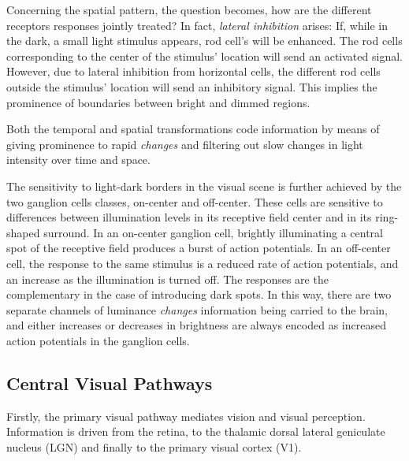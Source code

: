 Concerning the spatial pattern, the question becomes, how are the different receptors responses jointly treated? In fact, \textit{lateral inhibition} arises: If, while in the dark, a small light stimulus appears, rod cell's will be enhanced. The rod cells corresponding to the center of the stimulus' location will send an activated signal. However, due to lateral inhibition from horizontal cells, the different rod cells outside the stimulus' location will send an inhibitory signal. This implies the prominence of boundaries between bright and dimmed regions.

Both the temporal and spatial transformations code information by means of giving prominence to rapid \textit{changes} and filtering out slow changes in light intensity over time and space. 

The sensitivity to light-dark borders in the visual scene is further achieved by the two ganglion cells classes, on-center and off-center. These cells are sensitive to differences between illumination levels in its receptive field center and in its ring-shaped surround. In an on-center ganglion cell, brightly illuminating a central spot of the receptive field produces a burst of action potentials. In an off-center cell, the response to the same stimulus is a reduced rate of action potentials, and an increase as the illumination is turned off. The responses are the complementary in the case of introducing dark spots. In this way, there are two separate channels of luminance \textit{changes} information being carried to the brain, and either increases or decreases in brightness are always encoded as increased action potentials in the ganglion cells.






\subsection{Central Visual Pathways}

Firstly, the primary visual pathway mediates vision and visual perception. Information is driven from the retina, to the thalamic dorsal lateral geniculate nucleus (LGN) and finally to the primary visual cortex (V1).%

